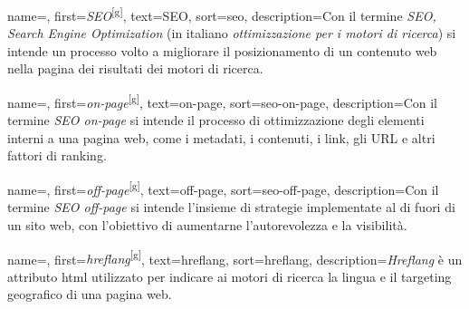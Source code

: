 





 {
    name=,
    first={\textit{SEO}\textsuperscript{[g]}},
    text=SEO,
    sort=seo,
    description={Con il termine \textit{SEO, Search Engine Optimization} (in italiano \textit{ottimizzazione per i motori di ricerca}) si intende un processo volto a migliorare il posizionamento di un contenuto web nella pagina dei risultati dei motori di ricerca.}
}

 {
    name=,
    first={\textit{on-page}\textsuperscript{[g]}},
    text=on-page,
    sort=seo-on-page,
    description={Con il termine \textit{SEO on-page} si intende il processo di ottimizzazione degli elementi interni a una pagina web, come i metadati, i contenuti, i link, gli URL e altri fattori di ranking.}
}

 {
    name=,
    first={\textit{off-page}\textsuperscript{[g]}},
    text=off-page,
    sort=seo-off-page,
    description={Con il termine \textit{SEO off-page} si intende l'insieme di strategie implementate al di fuori di un sito web, con l'obiettivo di aumentarne l'autorevolezza e la visibilità.}
}

 {
    name=,
    first={\textit{hreflang}\textsuperscript{[g]}},
    text=hreflang,
    sort=hreflang,
    description={\textit{Hreflang} è un attributo \gls{html} utilizzato per indicare ai motori di ricerca la lingua e il targeting geografico di una pagina web.}
}

